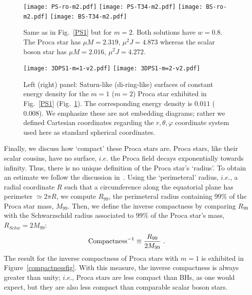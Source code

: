 \begin{figure}[h!]
  \begin{center}
    \texttt{[image: PS-ro-m2.pdf]}
       \texttt{[image: PS-T34-m2.pdf]}   
        \texttt{[image: BS-ro-m2.pdf]}
      \texttt{[image: BS-T34-m2.pdf]}
  \end{center}
 \caption{Same as in Fig.~\ref{PS1} but for $m=2$. Both solutions have $w=0.8$. The Proca star has $\mu M=2.319$, 
$\mu^2J=4.873$ whereas the scalar boson star has $\mu M=2.016$, $\mu^2J=4.272$.}
  \label{PS2}
\end{figure}


\begin{figure}[h!]
  \begin{center}
    \texttt{[image: 3DPS1-m=1-v2.pdf]} \qquad \qquad 
       \texttt{[image: 3DPS1-m=2-v2.pdf]}   
         \end{center}
 \caption{Left (right) panel: Saturn-like (di-ring-like) surfaces of constant energy density for the $m=1$ ($m=2$) Proca star exhibited in Fig.~\ref{PS1} (Fig.~\ref{PS2}). The corresponding energy density is $0.011$ ($0.008$). We emphasize these are not embedding diagrams; rather we defined Cartesian coordinates regarding the $r,\theta,\varphi$ coordinate system used here as standard spherical coordinates.}
  \label{3D}
\end{figure}

Finally, we discuss how `compact' these Proca stars are. Proca stars, like their scalar cousins, have no surface, $i.e.$ the Proca field decays exponentially towards infinity. Thus, there is no unique definition of the Proca star's `radius'. To obtain an estimate we follow the discussion in~\cite{AmaroSeoane:2010qx,Herdeiro:2015gia}. Using the `perimeteral' radius, $i.e.$, a radial coordinate $R$ such that a circumference along the equatorial plane has perimeter $\simeq 2\pi R$,  we compute $R_{99}$, the perimeteral radius containing 99\% of the Proca star mass, $M_{99}$. Then, we define the inverse compactness by comparing $R_{99}$ with the Schwarzschild radius associated to 99\% of the Proca star's mass, $R_{Schw}=2M_{99}$:
%
\begin{equation}
{\rm Compactness}^{-1}\equiv  \frac{R_{99}}{2M_{99}} \ .
\label{compactness}
\end{equation}
%
The result for the inverse compactness of Proca stars with $m=1$ is exhibited in Figure~\ref{compactnessfig}. With this measure, the inverse compactness is always greater than unity; $i.e.$, Proca stars are less compact than BHs, as one would expect, but they are also less compact than comparable scalar boson stars.


